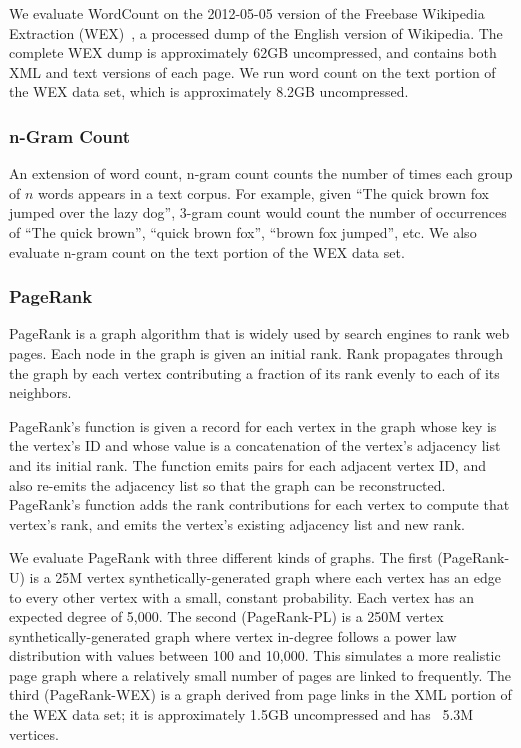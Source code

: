 We evaluate WordCount on the 2012-05-05 version of the Freebase Wikipedia
Extraction (WEX)~\cite{wex}, a processed dump of the English version of
Wikipedia. The complete WEX dump is approximately 62GB uncompressed, and
contains both XML and text versions of each page. We run word count on the text
portion of the WEX data set, which is approximately 8.2GB uncompressed.

\subsubsection{n-Gram Count}

 An extension of word count, n-gram count counts the
number of times each group of $n$ words appears in a text corpus. For
example, given ``The quick brown fox jumped over the lazy dog'', 3-gram count
would count the number of occurrences of ``The quick brown'', ``quick brown
fox'', ``brown fox jumped'', etc. We also evaluate n-gram count on the text
portion of the WEX data set.

\subsubsection{PageRank}

PageRank is a graph algorithm that is widely used by
search engines to rank web pages.  Each node in the graph is given an initial
rank. Rank propagates through the graph by each vertex contributing a fraction
of its rank evenly to each of its neighbors.

PageRank's \map function is given a record for each vertex in the graph whose
key is the vertex's ID and whose value is a concatenation of the vertex's
adjacency list and its initial rank. The \map function emits  pairs for each adjacent vertex ID, and also
re-emits the adjacency list so that the graph can be reconstructed. PageRank's
\reduce function adds the rank contributions for each vertex to compute that
vertex's rank, and emits the vertex's existing adjacency list and new rank.

We evaluate PageRank with three different kinds of graphs. The first
(PageRank-U) is a 25M vertex synthetically-generated graph where each vertex
has an edge to every other vertex with a small, constant probability. Each
vertex has an expected degree of 5,000. The second (PageRank-PL) is a 250M
vertex synthetically-generated graph where vertex in-degree follows a power law
distribution with values between 100 and 10,000. This simulates a more realistic
page graph where a relatively small number of pages are linked to
frequently. The third (PageRank-WEX) is a graph derived from page links in the
XML portion of the WEX data set; it is approximately 1.5GB uncompressed and has
~5.3M vertices.

